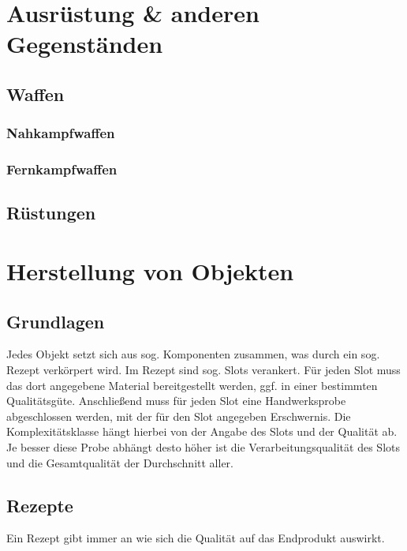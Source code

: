 \documentclass[a4paper,12pt,oneside]{book}
\begin{document}
\part{Ausrüstung \& anderen Gegenständen}
\setcounter{chapter}{0}
\chapter{Waffen}
\section{Nahkampfwaffen}

\section{Fernkampfwaffen}
\chapter{Rüstungen}



\part{Herstellung von Objekten}
\setcounter{chapter}{0}
\chapter{Grundlagen}
Jedes Objekt setzt sich aus sog. Komponenten zusammen, was durch ein sog. Rezept verkörpert wird. Im Rezept sind sog. Slots verankert. Für jeden Slot muss das dort angegebene Material bereitgestellt werden, ggf. in einer bestimmten Qualitätsgüte. Anschließend muss für jeden Slot eine Handwerksprobe abgeschlossen werden, mit der für den Slot angegeben Erschwernis. Die Komplexitätsklasse hängt hierbei von der Angabe des Slots und der Qualität ab. Je besser diese Probe abhängt desto höher ist die Verarbeitungsqualität des Slots und die Gesamtqualität der Durchschnitt aller.
\chapter{Rezepte}
Ein Rezept gibt immer an wie sich die Qualität auf das Endprodukt auswirkt.
\end{document}
